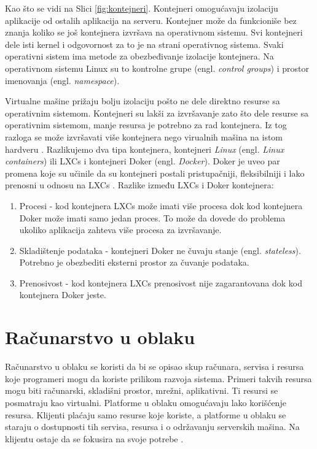 \documentclass[12pt,oneside]{memoir}
\begin{document}
Kao što se vidi na Slici \ref{fig:kontejneri}. Kontejneri omogućavaju izolaciju aplikacije od ostalih aplikacija na serveru. Kontejner može da funkcioniše bez znanja koliko se još kontejnera izvršava na operativnom sistemu. Svi kontejneri dele isti kernel i odgovornost za to je na strani operativnog sistema. Svaki operativni sistem ima metode za obezbeđivanje izolacije kontejnera. Na operativnom sistemu Linux su to kontrolne grupe (engl. \emph{control groups}) i prostor imenovanja (engl. \emph{namespace}). 


Virtualne mašine prižaju bolju izolaciju pošto ne dele direktno resurse sa operativnim sistemom. Kontejneri su lakši za izvršavanje zato što dele resurse sa operativnim sistemom, manje resursa je potrebno za rad kontejnera. Iz tog razloga se može izvršavati više kontejnera nego virualnih mašina na istom hardveru \cite{mac}. Razlikujemo dva tipa kontejnera, kontejneri \emph{Linux} (engl. \emph{Linux containers}) ili LXCs i kontejneri Doker (engl. \emph{Docker}). Doker je uveo par promena koje su učinile da su kontejneri postali pristupačniji, fleksibilniji i lako prenosni u odnosu na LXCs \cite{gswc}. Razlike između LXCs i Doker kontejnera:
\begin{enumerate}
  \item Procesi - kod kontejnera LXCs može imati više procesa dok kod kontejnera Doker može imati samo jedan proces. To može da dovede do problema ukoliko aplikacija zahteva više procesa za izvršavanje.
  \item Skladištenje podataka - kontejneri Doker ne čuvaju stanje (engl. \emph{stateless}). Potrebno je obezbediti eksterni prostor za čuvanje podataka.
  \item Prenosivost - kod kontejnera LXCs prenosivost nije zagarantovana dok kod kontejnera Doker jeste.
\end{enumerate}

\section{Računarstvo u oblaku}

Računarstvo u oblaku se koristi da bi se opisao skup računara, servisa i resursa koje programeri mogu da koriste prilikom razvoja sistema. Primeri takvih resursa mogu biti računarski, skladišni prostor, mrežni, aplikativni. Ti resursi se posmatraju kao virtualni. Platforme u oblaku omogućavaju lako korišćenje resursa. Klijenti plaćaju samo resurse koje koriste, a platforme u oblaku se staraju o dostupnosti tih servisa, resursa i o održavanju serverskih mašina. Na klijentu ostaje da se fokusira na svoje potrebe \cite{cc}.
\end{document}
